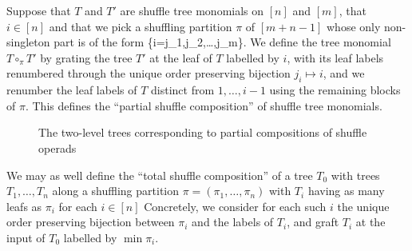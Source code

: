 \documentclass[fleqn, a4paper, twoside]{article}
\makeatletter
\newcommand{\0}{\langle 0\rangle}
\let\[\@undefined
\DeclareRobustCommand{\[}{\begin{equation}}%
\let\]\@undefined
\DeclareRobustCommand{\]}{\end{equation}}%
\theoremstyle{mytheorem}
\theoremstyle{introthm}
\theoremstyle{mydefinition}
\theoremstyle{mydefinition2}
\theoremstyle{plain} %
\newcommand{\?}{\,?\,}
\theoremstyle{mytheorem}
\theoremstyle{plain} %
\makeatother
\begin{document}
Suppose that $T$ and $T'$ are shuffle tree
monomials on $[n]$ and $[m]$, that $i\in [n]$
and that we pick a shuffling partition $\pi$ of
$[m+n-1]$ whose only non-singleton part
is of the form 
\[ \{i=j_1,j_2,\dots,j_m\}.\]
We define the tree monomial $T\circ_\pi T'$
by grating the tree $T'$ at the leaf of $T$
labelled by $i$, with its leaf labels
renumbered through the unique order
preserving bijection $j_i \longmapsto
i$, and we renumber the leaf labels
of $T$ distinct from $1,\ldots,i-1$ using
the remaining blocks of $\pi$. This
defines the ``partial shuffle composition''
of shuffle tree monomials.

\begin{figure}

\caption{The two-level trees corresponding
 to partial compositions of shuffle operads}
\end{figure}
We may as well define the ``total shuffle
composition'' of a tree $T_0$ with trees
$T_1,\ldots,T_n$ along a shuffling partition
$\pi = (\pi_1,\ldots,\pi_n)$ with $T_i$ having
as many leafs as $\pi_i$ for each $i\in [n]$
Concretely, we consider for each such $i$
the unique order preserving bijection
between $\pi_i$ and the labels of $T_i$,
and graft $T_i$ at the input of $T_0$
labelled by $\min \pi_i$. 
\end{document}
